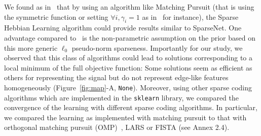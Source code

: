 \documentclass[vision,article,submit,oneauthor,pdftex]{Definitions/mdpi}
\newcommand{\coef}{\mathbf{a}} %
\newcommand{\image}{\mathbf{y}} %
\newcommand{\dico}{\Phi} %
\newcommand{\eqdef}{\ensuremath{\stackrel{\mbox{\upshape\tiny def.}}{=}}}
\newcommand{\seeFig}[1]{Figure~\ref{fig:#1}}%
\begin{document}
We found as in~\citep{Rehn07} that by using an algorithm like Matching Pursuit (that is using the symmetric function or setting $\forall i, \gamma_i=1$ as in~\citep{Mairal14} for instance), the Sparse Hebbian Learning algorithm could provide results similar to {\sc SparseNet}. One advantage compared to~\citep{Olshausen97} is the non-parametric assumption on the prior based on this more generic $\ell_0$ pseudo-norm sparseness. Importantly for our study, we observed that this class of algorithms could lead to solutions corresponding to a local minimum of the full objective function: Some solutions seem as efficient as others for representing the signal but do not represent edge-like features homogeneously (\seeFig{map}-A, \texttt{None}). %
Moreover, using other sparse coding algorithms which are implemented in the \verb+sklearn+ library, we compared the convergence of the learning with different sparse coding algorithms. In particular, we compared the learning as implemented with matching pursuit to that with orthogonal matching pursuit (OMP)~\citep{pati1993orthogonal}, LARS or FISTA (see Annex 2.4). %
\end{document}
